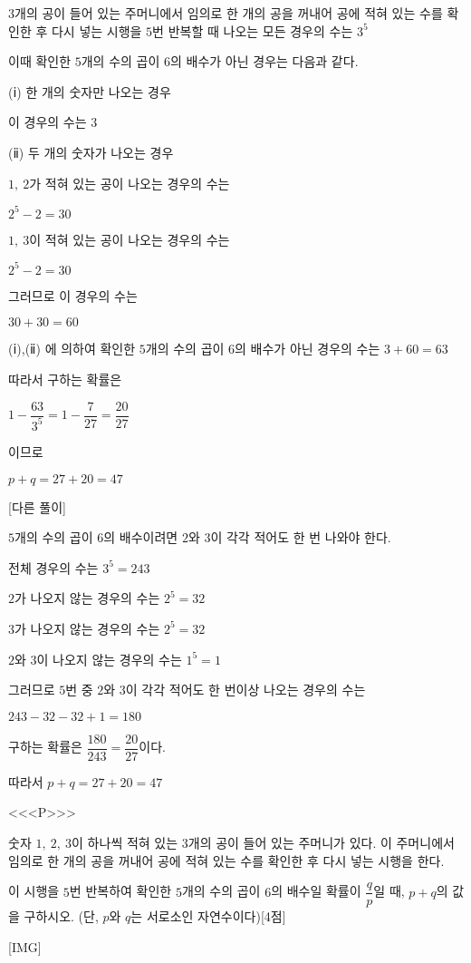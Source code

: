 \documentclass{oblivoir}
\begin{document}
$3$개의 공이 들어 있는 주머니에서 임의로 한 개의 공을 꺼내어 공에 적혀 있는 수를 확인한 후 다시 넣는 시행을 $5$번 반복할 때 나오는 모든 경우의 수는 $3^{5}$

이때 확인한 $5$개의 수의 곱이 $6$의 배수가 아닌 경우는 다음과 같다.

(ⅰ) 한 개의 숫자만 나오는 경우

이 경우의 수는 $3$

(ⅱ) 두 개의 숫자가 나오는 경우

$1,\: 2$가 적혀 있는 공이 나오는 경우의 수는

$2^{5}-2=30$

$1,\: 3$이 적혀 있는 공이 나오는 경우의 수는

$2^{5}-2=30$

그러므로 이 경우의 수는

$30+30=60$

(ⅰ),(ⅱ) 에 의하여 확인한 $5$개의 수의 곱이 $6$의 배수가 아닌 경우의 수는 $3+60=63$

따라서 구하는 확률은

$1-\dfrac{63}{3^{5}}=1-\dfrac{7}{27}=\dfrac{20}{27}$

이므로

$p+q=27+20=47$

[다른 풀이]

$5$개의 수의 곱이 $6$의 배수이려면 $2$와 $3$이 각각 적어도 한 번 나와야 한다.

전체 경우의 수는 $3^{5}=243$

$2$가 나오지 않는 경우의 수는 $2^{5}=32$

$3$가 나오지 않는 경우의 수는 $2^{5}=32$

$2$와 $3$이 나오지 않는 경우의 수는 $1^{5}=1$

그러므로 $5$번 중 $2$와 $3$이 각각 적어도 한 번이상 나오는 경우의 수는 

$243-32-32+1=180$

구하는 확률은 $\dfrac{180}{243}=\dfrac{20}{27}$이다.

따라서 $p+q=27+20=47$

<<<P>>>

숫자 $1,\: 2,\: 3$이 하나씩 적혀 있는 $3$개의 공이 들어 있는 주머니가 있다. 이 주머니에서 임의로 한 개의 공을 꺼내어 공에 적혀 있는 수를 확인한 후 다시 넣는 시행을 한다.

이 시행을 $5$번 반복하여 확인한 $5$개의 수의 곱이 $6$의 배수일 확률이 $\dfrac{q}{p}$일 때, $p+q$의 값을 구하시오. (단, $p$와 $q$는 서로소인 자연수이다)[4점]

[IMG]
\end{document}
